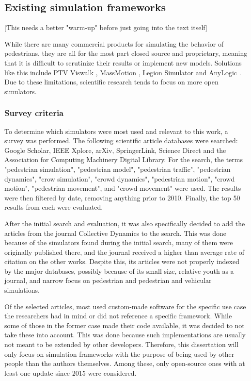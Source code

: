 \documentclass[twoside, 11pt]{article}
\begin{document}
\subsection{Existing simulation frameworks} \label{sec:existing-frameworks}

[This needs a better "warm-up" before just going into the text itself]

While there are many commercial products for simulating the behavior of pedestrians, they are all for the most part closed source and proprietary, meaning that it is difficult to scrutinize their results or implement new models. Solutions like this include PTV Viswalk \cite{viswalk}, MassMotion \cite{massmotion}, Legion Simulator \cite{legionsimulator} and AnyLogic \cite{anylogic}. Due to these limitations, scientific research tends to focus on more open simulators. 

\subsubsection{Survey criteria}

To determine which simulators were most used and relevant to this work, a survey was performed. The following scientific article databases were searched: Google Scholar, IEEE Xplore, arXiv, SpringerLink, Science Direct and the Association for Computing Machinery Digital Library. For the search, the terms "pedestrian simulation", "pedestrian model", "pedestrian traffic", "pedestrian dynamics", "crow simulation", "crowd dynamics", "pedestrian motion", "crowd motion", "pedestrian movement", and "crowd movement" were used.
The results were then filtered by date, removing anything prior to 2010. Finally, the top 50 results from each were evaluated.

After the initial search and evaluation, it was also specifically decided to add the articles from the journal Collective Dynamics to the search. This was done because of the simulators found during the initial search, many of them were originally published there, and the journal received a higher than average rate of citation on the other works. Despite this, its articles were not properly indexed by the major databases, possibly because of its small size, relative youth as a journal, and narrow focus on pedestrian and pedestrian and vehicular simulations. 

Of the selected articles, most used custom-made software for the specific use case the researchers had in mind or did not reference a specific framework. While some of those in the former case made their code available, it was decided to not take these into account. This was done because such implementations are usually not meant to be extended by other developers. Therefore, this dissertation will only focus on simulation frameworks with the purpose of being used by other people than the authors themselves. Among these, only open-source ones with at least one update since 2015 were considered. 
\end{document}
